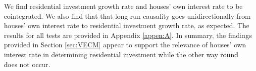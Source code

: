 We find residential investment growth rate and houses' own interest rate  to be cointegrated. We also find that that long-run causality goes unidirectionally from
houses' own interest rate to residential investment growth rate, as expected.  The results for all tests are
provided in Appendix \ref{appen:A}.
In summary, the findings provided in Section \ref{sec:VECM} appear to support the relevance of houses' own interest rate in determining residential investment while the other way round does not occur.


